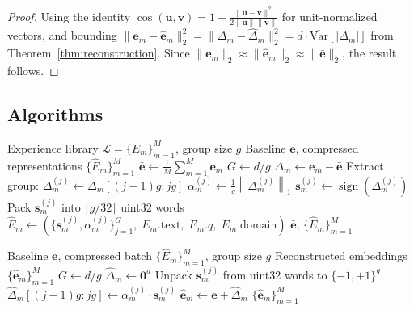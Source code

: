 \documentclass[11pt]{article}
\DeclareMathOperator{\sign}{sign}
\begin{document}
\begin{proof}
Using the identity $\cos(\bm{u}, \bm{v}) = 1 - \frac{\|\bm{u} - \bm{v}\|^2}{2\|\bm{u}\|\|\bm{v}\|}$
for unit-normalized vectors, and bounding $\|\bm{e}_m - \hat{\bm{e}}_m\|_2^2 =
\|\Delta_m - \hat{\Delta}_m\|_2^2 = d \cdot \overline{\mathrm{Var}}[|\Delta_m|]$
from Theorem~\ref{thm:reconstruction}. Since $\|\bm{e}_m\|_2 \approx
\|\hat{\bm{e}}_m\|_2 \approx \|\bar{\bm{e}}\|_2$, the result follows.
\end{proof}

\subsection{Algorithms}

\begin{algorithm}[H]
\caption{\textsc{BitDelta-Compress}}
\label{alg:compress}
\begin{algorithmic}[1]
\Require Experience library $\mathcal{L} = \{E_m\}_{m=1}^M$, group size $g$
\Ensure Baseline $\bar{\bm{e}}$, compressed representations $\{\widehat{E}_m\}_{m=1}^M$
\State $\bar{\bm{e}} \gets \frac{1}{M}\sum_{m=1}^M \bm{e}_m$ 
\State $G \gets d / g$ 
    \State $\Delta_m \gets \bm{e}_m - \bar{\bm{e}}$ 
        \State Extract group: $\Delta_m^{(j)} \gets \Delta_m[(j-1)g : jg]$
        \State $\alpha_m^{(j)} \gets \frac{1}{g}\left\|\Delta_m^{(j)}\right\|_1$
        \State $\bm{s}_m^{(j)} \gets \sign\!\left(\Delta_m^{(j)}\right)$
        \State Pack $\bm{s}_m^{(j)}$ into $\lceil g/32 \rceil$ uint32 words
    \EndFor
    \State $\widehat{E}_m \gets \left(\{\bm{s}_m^{(j)}, \alpha_m^{(j)}\}_{j=1}^G,\;
           E_m.\text{text},\; E_m.q,\; E_m.\text{domain}\right)$
\EndFor
\State \Return $\bar{\bm{e}}$, $\{\widehat{E}_m\}_{m=1}^M$
\end{algorithmic}
\end{algorithm}

\begin{algorithm}[H]
\caption{\textsc{BitDelta-Decompress}}
\label{alg:decompress}
\begin{algorithmic}[1]
\Require Baseline $\bar{\bm{e}}$, compressed batch $\{\widehat{E}_m\}_{m=1}^M$, group size $g$
\Ensure Reconstructed embeddings $\{\hat{\bm{e}}_m\}_{m=1}^M$
\State $G \gets d / g$
    \State $\hat{\Delta}_m \gets \bm{0}^d$
        \State Unpack $\bm{s}_m^{(j)}$ from uint32 words to $\{-1,+1\}^g$
        \State $\hat{\Delta}_m[(j-1)g : jg] \gets \alpha_m^{(j)} \cdot \bm{s}_m^{(j)}$
    \EndFor
    \State $\hat{\bm{e}}_m \gets \bar{\bm{e}} + \hat{\Delta}_m$
\EndFor
\State \Return $\{\hat{\bm{e}}_m\}_{m=1}^M$
\end{algorithmic}
\end{algorithm}
\end{document}

